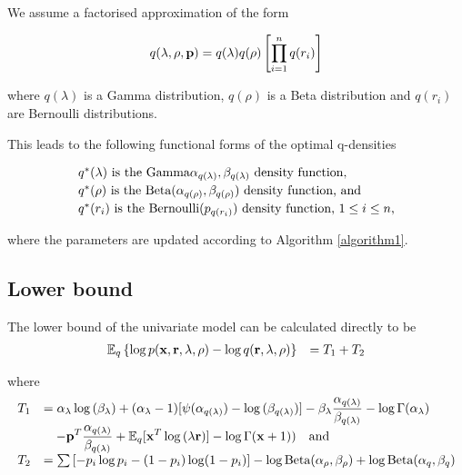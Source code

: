 \documentclass{article}[12pt]
\begin{document}
\noindent We assume a factorised approximation of the form

$$
q(\lambda, \rho, {\bf p}) = q(\lambda) q(\rho) \left [ \prod_{i=1}^n q(r_i) \right ]
$$

\noindent where $q(\lambda)$ is a Gamma distribution, $q(\rho)$ is a Beta distribution and
$q(r_i)$ are Bernoulli distributions.

\noindent This leads to the following functional forms of the optimal q-densities

$$
\begin{array}{l}
\mbox{$q^*(\lambda)$ is the $\text{Gamma} \alpha_{q(\lambda)}, \beta_{q(\lambda)}$ density function,} \\ [0.5ex]
\mbox{$q^*(\rho)$ is the $\text{Beta}(\alpha_{q(\rho)}, \beta_{q(\rho)})$ density function, and} \\ [0.5ex]
\mbox{$q^*(r_i)$  is the $\text{Bernoulli}(p_{q(r_i)})$ density function, $1 \leq i \leq n$,}
\end{array}
$$


\noindent where the parameters are updated according to Algorithm \ref{algorithm1}. 

\subsection{Lower bound}
The lower bound of the univariate model can be calculated directly to be
$$
\begin{array}{rl}
{\mathbb E}_q \left\{ \log{p({\bf x}, {\bf r}, \lambda, \rho)} - \log{q({\bf r}, \lambda, \rho)} \right\} &= T_1 + T_2 \\
\end{array}
$$

\noindent where
$$
\begin{array}{rl}
T_1 & \displaystyle =
\alpha_\lambda \log{(\beta_\lambda)} + (\alpha_\lambda - 1) [\psi(\alpha_{q(\lambda)}) - \log{(\beta_{q(\lambda)})}] - \beta_\lambda \frac{\alpha_{q(\lambda)}}{\beta_{q(\lambda)}} - \log\Gamma(\alpha_\lambda) \\
& \displaystyle \quad -{\bf p}^T\frac{\alpha_{q(\lambda)}}{\beta_{q(\lambda)}} + {\mathbb E}_q[{\bf x}^T \log{(\lambda {\bf r})}] - \log\Gamma({\bf x}+1)) \quad \mbox{and} 
\\ [1ex]
T_2 &= \sum \left [ - p_i \log p_i - (1 - p_i) \log (1 - p_i) \right ] - \log \text{Beta} (\alpha_\rho, \beta_\rho) + \log \text{Beta} (\alpha_q, \beta_q)
\end{array}
$$
\end{document}
